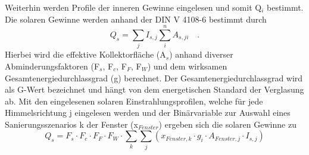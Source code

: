 Weiterhin werden Profile der inneren Gewinne eingelesen und somit Q\(_i\) bestimmt.
Die solaren Gewinne werden anhand der DIN V 4108-6 bestimmt durch
\begin{equation}
\label{eq:Gleichung3298}
Q_s = \sum_j I_{s,j} \sum_{i}^{n} A_{s,ji} \quad \text{.}
\end{equation}
Hierbei wird die effektive Kollektorfläche (A\(_s\)) anhand diverser Abminderungsfaktoren (F\(_s\), F\(_c\), F\(_F\), F\(_W\)) und dem wirksamen Gesamtenergiedurchlassgrad (g) berechnet.
Der Gesamtenergiedurchlassgrad wird als G-Wert bezeichnet und hängt von dem energetischen Standard der Verglasung ab.
Mit den eingelesenen solaren Einstrahlungsprofilen, welche für jede Himmelsrichtung j eingelesen werden und der Binärvariable zur Auswahl eines Sanierungsszenarios k der Fenster (x\(_{Fenster}\)) ergeben sich die solaren Gewinne zu
\begin{equation}
\label{eq:Gleichung3299}
Q_s = F_s \cdot F_c \cdot F_F \cdot F_W \cdot \sum_{k} \sum_{j} (x_{Fenster, k} \cdot g_i \cdot A_{Fenster, j} \cdot I_{s,j} )
\end{equation}

